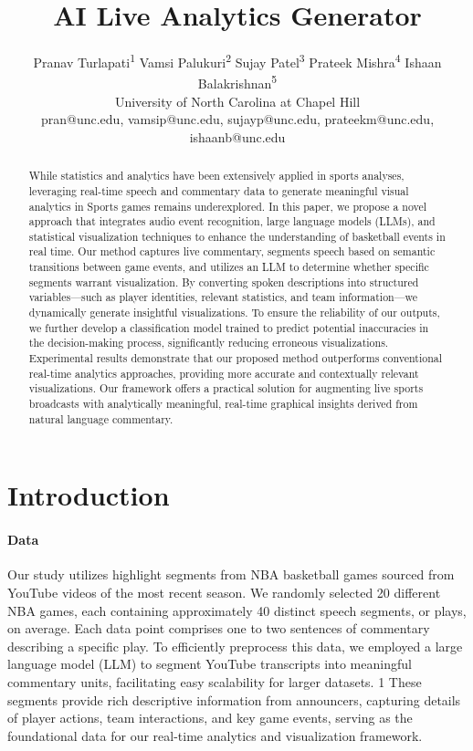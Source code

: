 \documentclass{article}
\title{AI Live Analytics Generator}
\author{
  Pranav Turlapati\textsuperscript{1} \quad
  Vamsi Palukuri\textsuperscript{2} \quad
  Sujay Patel\textsuperscript{3} \quad
  Prateek Mishra\textsuperscript{4} \quad
  Ishaan Balakrishnan\textsuperscript{5} \\
  University of North Carolina at Chapel Hill \\
  pran@unc.edu, vamsip@unc.edu, sujayp@unc.edu, prateekm@unc.edu, ishaanb@unc.edu
}
\begin{document}
\maketitle


\begin{abstract}
  While statistics and analytics have been extensively applied in sports analyses, leveraging real-time speech and commentary data to generate meaningful visual analytics in Sports games remains underexplored. In this paper, we propose a novel approach that integrates audio event recognition, large language models (LLMs), and statistical visualization techniques to enhance the understanding of basketball events in real time. Our method captures live commentary, segments speech based on semantic transitions between game events, and utilizes an LLM to determine whether specific segments warrant visualization. By converting spoken descriptions into structured variables—such as player identities, relevant statistics, and team information—we dynamically generate insightful visualizations. To ensure the reliability of our outputs, we further develop a classification model trained to predict potential inaccuracies in the decision-making process, significantly reducing erroneous visualizations. Experimental results demonstrate that our proposed method outperforms conventional real-time analytics approaches, providing more accurate and contextually relevant visualizations. Our framework offers a practical solution for augmenting live sports broadcasts with analytically meaningful, real-time graphical insights derived from natural language commentary.

\end{abstract}


\section{Introduction}

\paragraph{Data}

Our study utilizes highlight segments from NBA basketball games sourced from YouTube
videos of the most recent season. We randomly selected 20 different NBA games, each
containing approximately 40 distinct speech segments, or plays, on average. Each data
point comprises one to two sentences of commentary describing a specific play. To efficiently
preprocess this data, we employed a large language model (LLM) to segment YouTube
transcripts into meaningful commentary units, facilitating easy scalability for larger datasets.
1
These segments provide rich descriptive information from announcers, capturing details of
player actions, team interactions, and key game events, serving as the foundational data for
our real-time analytics and visualization framework.
\end{document}
